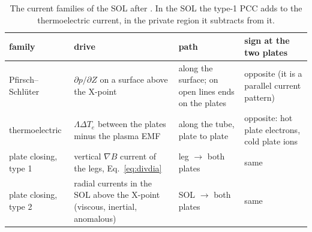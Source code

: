 \documentclass[11pt,a4paper]{article}
\newcommand{\Te}{T_e}
\begin{document}
\begin{table}[h]
\centering
\begin{tabular}{p{3.2cm}p{4.6cm}p{3.4cm}p{3.4cm}}
\toprule
family & drive & path & sign at the two plates \\
\midrule
Pfirsch--Schl\"uter & $\partial p/\partial Z$ on a surface above the X-point & along the surface; on open lines ends on the plates & opposite (it is a parallel current pattern) \\
thermoelectric & $\Lambda\Delta\Te$ between the plates minus the plasma EMF & along the tube, plate to plate & opposite: hot plate electrons, cold plate ions \\
plate closing, type 1 & vertical $\nabla B$ current of the legs, Eq.~\eqref{eq:divdia} & leg $\to$ both plates & same \\
plate closing, type 2 & radial currents in the SOL above the X-point (viscous, inertial, anomalous) & SOL $\to$ both plates & same \\
\bottomrule
\end{tabular}
\caption{The current families of the SOL after \cite{rozhansky2020,sorokina}. In the SOL the type-1 PCC adds to the
thermoelectric current, in the private region it subtracts from it.}
\label{tab:families}
\end{table}
\end{document}
